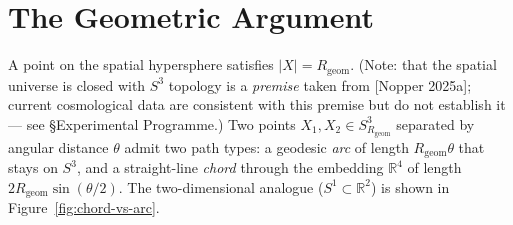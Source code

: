\documentclass[11pt,a4paper]{article}
\newcommand{\Rgeom}{R_{\mathrm{geom}}}
\begin{document}
\section{The Geometric Argument}
\label{sec:geometry}

A point on the spatial hypersphere satisfies $\lvert X\rvert = \Rgeom$. (Note: that the spatial universe is closed with $S^3$ topology is a \emph{premise} taken from [Nopper 2025a]; current cosmological data are consistent with this premise but do not establish it --- see \S Experimental Programme.) Two points $X_1, X_2 \in S^3_{\Rgeom}$ separated by angular distance $\theta$ admit two path types: a geodesic \emph{arc} of length $\Rgeom\theta$ that stays on $S^3$, and a straight-line \emph{chord} through the embedding $\mathbb{R}^4$ of length $2\Rgeom\sin(\theta/2)$. The two-dimensional analogue ($S^1 \subset \mathbb{R}^2$) is shown in Figure~\ref{fig:chord-vs-arc}.
\end{document}
